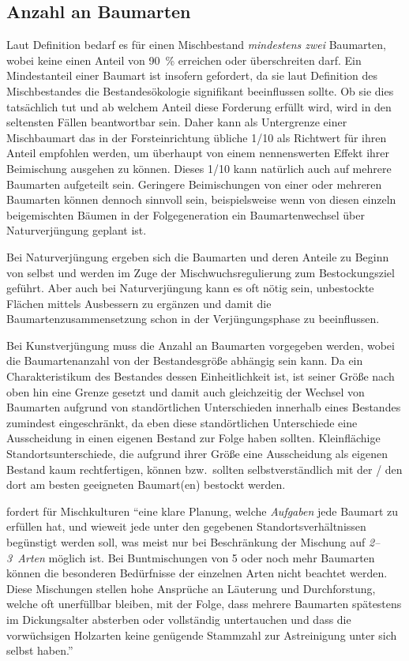 \documentclass[twocolumn, paper=a4, fontsize=10pt, bibliography=totoc, index=totoc]{scrartcl}
\begin{document}
\subsection{Anzahl an Baumarten}
\label{ssec:anzahlBaumarten}

Laut Definition bedarf es für einen Mischbestand \emph{mindestens zwei}
Baumarten, wobei keine einen Anteil von \qty{90}{\percent} erreichen oder überschreiten
darf. Ein Mindestanteil einer Baumart ist insofern gefordert, da sie laut
Definition des Mischbestandes die Bestandesökologie signifikant beeinflussen
sollte. Ob sie dies tatsächlich tut und ab welchem Anteil diese Forderung
erfüllt wird, wird in den seltensten Fällen beantwortbar sein. Daher kann als
Untergrenze einer Mischbaumart das in der Forsteinrichtung übliche 1/10 als
Richtwert für ihren Anteil empfohlen werden, um überhaupt von einem
nennenswerten Effekt ihrer Beimischung ausgehen zu können. Dieses 1/10 kann
natürlich auch auf mehrere Baumarten aufgeteilt sein. Geringere Beimischungen
von einer oder mehreren Baumarten können dennoch sinnvoll sein, beispielsweise
wenn von diesen einzeln beigemischten Bäumen in der Folgegeneration ein
Baumartenwechsel über Naturverjüngung geplant ist.

Bei Naturverjüngung ergeben
sich die Baumarten und deren Anteile zu Beginn von selbst und werden im Zuge der
Mischwuchsregulierung zum Bestockungsziel geführt. Aber auch bei Naturverjüngung
kann es oft nötig sein, unbestockte Flächen mittels Ausbessern zu ergänzen und
damit die Baumartenzusammensetzung schon in der Verjüngungsphase zu
beeinflussen.

Bei Kunstverjüngung muss die Anzahl an Baumarten vorgegeben
werden, wobei die Baumartenanzahl von der Bestandesgröße abhängig sein kann. Da
ein Charakteristikum des Bestandes dessen Einheitlichkeit ist, ist seiner Größe
nach oben hin eine Grenze gesetzt und damit auch gleichzeitig der Wechsel von
Baumarten aufgrund von standörtlichen Unterschieden innerhalb eines Bestandes
zumindest eingeschränkt, da eben diese standörtlichen Unterschiede eine
Ausscheidung in einen eigenen Bestand zur Folge haben sollten. Kleinflächige
Standortsunterschiede, die aufgrund ihrer Größe eine Ausscheidung als eigenen
Bestand kaum rechtfertigen, können bzw.\ sollten selbstverständlich mit der / den
dort am besten geeigneten Baumart(en) bestockt werden.

\citet[S.~218\,f.]{wiedemann1951Ertragskunde} fordert für Mischkulturen \enquote{eine klare Planung, welche \emph{Aufgaben} jede Baumart zu erfüllen hat, und
wieweit jede unter den gegebenen Standortsverhältnissen begünstigt werden soll,
was meist nur bei Beschränkung der Mischung auf \emph{2--3~Arten} möglich ist.
Bei Buntmischungen von 5 oder noch mehr Baumarten können die besonderen
Bedürfnisse der einzelnen Arten nicht beachtet werden. Diese Mischungen stellen
hohe Ansprüche an Läuterung und Durchforstung, welche oft unerfüllbar bleiben,
mit der Folge, dass mehrere Baumarten spätestens im Dickungsalter absterben oder
vollständig untertauchen und dass die vorwüchsigen Holzarten keine genügende
Stammzahl zur Astreinigung unter sich selbst haben.}
\end{document}
